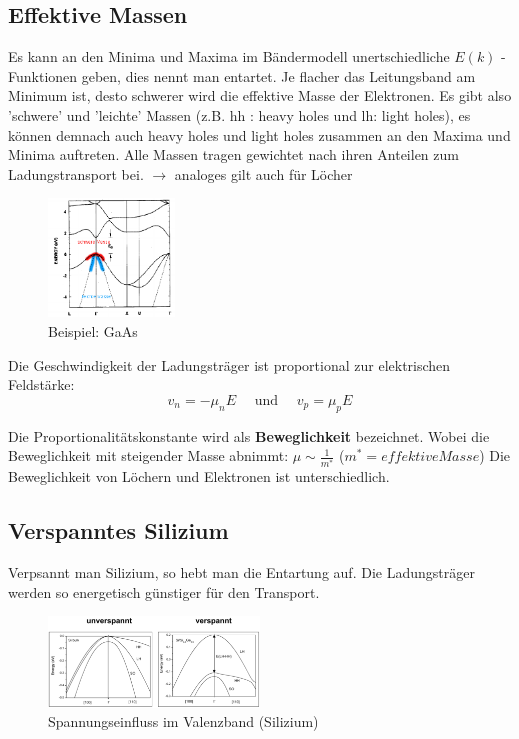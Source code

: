 \subsection{Effektive Massen}
	Es kann an den Minima und Maxima im Bändermodell unertschiedliche $E(k)$ -Funktionen geben, dies nennt man entartet. 
	Je flacher das Leitungsband am Minimum ist, desto schwerer wird die effektive Masse der Elektronen. Es gibt also 'schwere' und 'leichte' Massen (z.B. hh : heavy holes und lh: light holes), es können demnach auch heavy holes und light holes zusammen an den Maxima und Minima auftreten.
	Alle Massen tragen gewichtet nach ihren Anteilen zum Ladungstransport bei. 
	$\rightarrow$ analoges gilt auch für Löcher
	
	\begin{figure}[h!]
		\centering
		\includegraphics[width=0.3\textwidth]{Kapitel/Kap03/effektiveMasse.png}
		\caption{Beispiel: GaAs}
		\label{02_effMasse}
	\end{figure}

	Die Geschwindigkeit der Ladungsträger ist proportional zur elektrischen Feldstärke:
	\begin{equation*}
		v_n = {-\mu}_n E \quad \textrm{ und } \quad v_p = {\mu}_p E
	\end{equation*}
	
	Die Proportionalitätskonstante wird als \textbf{Beweglichkeit} bezeichnet. Wobei die Beweglichkeit mit steigender Masse abnimmt: ${\mu} \sim \frac{1}{m^*}$ ($m^* = effektive Masse$)
	Die Beweglichkeit von Löchern und Elektronen ist unterschiedlich.
	
\subsection{Verspanntes Silizium}
	Verpsannt man Silizium, so hebt man die Entartung auf. Die Ladungsträger werden so energetisch günstiger für den Transport.
	\begin{figure}[h!]
		\centering
		\includegraphics[width=0.5\textwidth]{Kapitel/Kap03/verspanntesSi.png}
		\caption{Spannungseinfluss im Valenzband (Silizium)}
		\label{02_verspSi}
	\end{figure}
	
